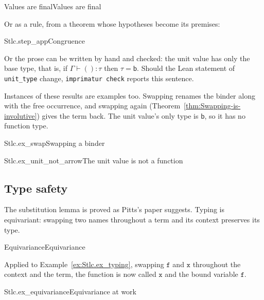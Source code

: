 \documentclass{article}
\begin{document}
\begin{leantheorem}{Values are final}{Values are final}
\end{leantheorem}

Or as a rule, from a theorem whose hypotheses become its premises:
\begin{center}
\begin{leanblock}[view=math, rule]{Stlc.step_app}{Congruence}
\end{leanblock}
\end{center}

Or the prose can be written by hand and checked: the unit value has only
the base type, that is, if $\Gamma \vdash () : \tau$ then
$\tau = \mathsf{b}$. Should the Lean statement of
\verb|unit_type| change, \texttt{imprimatur check} reports this sentence.

Instances of these results are examples too. Swapping renames the binder
along with the free occurrence, and swapping again
(Theorem~\ref{thm:Swapping-is-involutive}) gives the term back. The unit
value's only type is $\mathsf{b}$, so it has no function type.

\begin{leanexample}{Stlc.ex_swap}{Swapping a binder}
\end{leanexample}

\begin{leanexample}{Stlc.ex_unit_not_arrow}{The unit value is not a function}
\end{leanexample}

\subsection{Type safety}

The substitution lemma is proved as Pitts's paper suggests. Typing is
equivariant: swapping two names throughout a term and its context preserves
its type.

\begin{leantheorem}{Equivariance}{Equivariance}
\end{leantheorem}

Applied to Example~\ref{ex:Stlc.ex_typing}, swapping $\mathtt{f}$ and
$\mathtt{x}$ throughout the context and the term, the function is now called
$\mathtt{x}$ and the bound variable $\mathtt{f}$.

\begin{leanexample}{Stlc.ex_equivariance}{Equivariance at work}
\end{leanexample}
\end{document}
